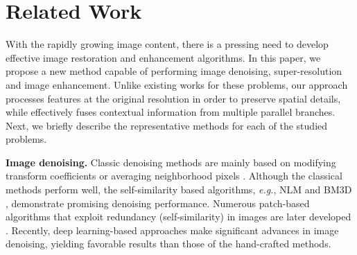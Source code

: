 \documentclass[runningheads]{llncs}
\begin{document}
\section{Related Work}
With the rapidly growing image content, there is a pressing need to develop effective image restoration and enhancement algorithms. 
In this paper, we propose a new method capable of performing image denoising, super-resolution and image enhancement. Unlike existing works for these problems, our approach processes features at the original resolution in order to preserve spatial details, while effectively fuses contextual information from multiple parallel branches. Next, we briefly describe the representative methods for each of the studied problems. 


\vspace{0.4em}\noindent\textbf{Image denoising.} 
Classic denoising methods are mainly based on modifying transform coefficients \cite{yaroslavsky1996local,donoho1995noising,simoncelli1996noise} or averaging neighborhood pixels \cite{smith1997susan,tomasi1998bilateral,perona1990scale,rudin1992nonlinear}. 
Although the classical methods perform well, the self-similarity \cite{efros1999texture} based algorithms, \textit{e.g.}, NLM \cite{NLM} and BM3D \cite{BM3D}, demonstrate promising denoising performance. 
Numerous patch-based algorithms that exploit redundancy (self-similarity) in images are later developed \cite{dong2012nonlocal,WNNM,mairal2009non,hedjam2009markovian}. 
Recently, deep learning-based approaches \cite{MLP,RIDNet,Brooks2019,Gharbi2016,CBDNet,N3Net,DnCNN,FFDNetPlus,Zamir2020CycleISP} make significant advances in image denoising, yielding favorable results than those of the hand-crafted methods. 
\end{document}
